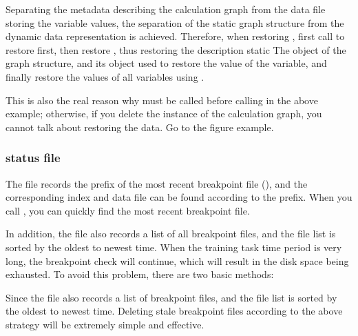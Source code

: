 \begin{content}
Separating the metadata describing the calculation graph from the data file storing the variable values, the separation of the static graph structure from the dynamic data representation is achieved. Therefore, when restoring , first call  to restore  first, then restore , thus restoring the description static The  object of the graph structure, and its  object used to restore the value of the variable, and finally restore the values ​​of all variables using .

This is also the real reason why  must be called before calling  in the above example; otherwise, if you delete the instance of the calculation graph, you cannot talk about restoring the data. Go to the figure example.

\subsubsection{status file}

The  file records the prefix of the most recent breakpoint file (), and the corresponding index and data file can be found according to the prefix. When you call , you can quickly find the most recent breakpoint file.


In addition, the  file also records a list of all breakpoint files, and the file list is sorted by the oldest to newest time. When the training task time period is very long, the breakpoint check will continue, which will result in the disk space being exhausted. To avoid this problem, there are two basic methods:

\begin{enum}
\end{enum}

Since the  file also records a list of breakpoint files, and the file list is sorted by the oldest to newest time. Deleting stale breakpoint files according to the above strategy will be extremely simple and effective.


\end{content}
